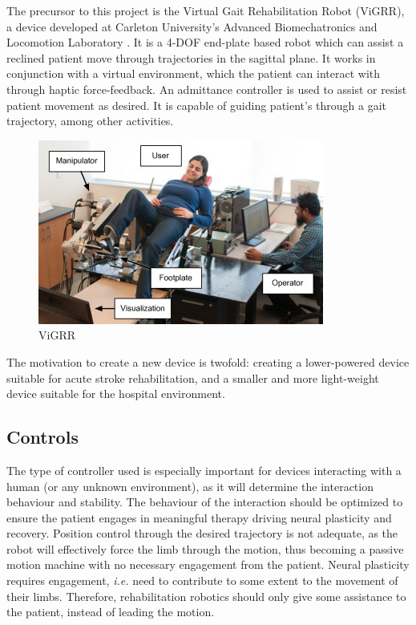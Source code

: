 \documentclass[12pt]{report}
\begin{document}
	
	The precursor to this project is the Virtual Gait Rehabilitation Robot (ViGRR), a device developed at Carleton University's Advanced Biomechatronics and Locomotion Laboratory \cite{Chisholm2014, Chisholm2010}. It is a 4-DOF end-plate based robot which can assist a reclined patient move through trajectories in the sagittal plane. It works in conjunction with a virtual environment, which the patient can interact with through haptic force-feedback. An admittance controller is used to assist or resist patient movement as desired. It is capable of guiding patient's through a gait trajectory, among other activities. 
	
	\begin{figure}[t] 
		\centering
		\includegraphics[width=0.75\linewidth]{Vigrr}
		\caption{ViGRR}
		\label{fig:vigrr}
	\end{figure}	
	
	The motivation to create a new device is twofold: creating a lower-powered device suitable for acute stroke rehabilitation, and a smaller and more light-weight device suitable for the hospital environment. 

	
	
	\subsection{Controls} 
	
	The type of controller used is especially important for devices interacting with a human (or any unknown environment), as it will determine the interaction behaviour and stability. The behaviour of the interaction should be optimized to ensure the patient engages in meaningful therapy driving neural plasticity and recovery. Position control through the desired trajectory is not adequate, as the robot will effectively force the limb through the motion, thus becoming a passive motion machine with no necessary engagement from the patient. Neural plasticity requires engagement, \textit{i.e.} need to contribute to some extent to the movement of their limbs. Therefore, rehabilitation robotics should only give some assistance to the patient, instead of leading the motion. 
	
\end{document}
